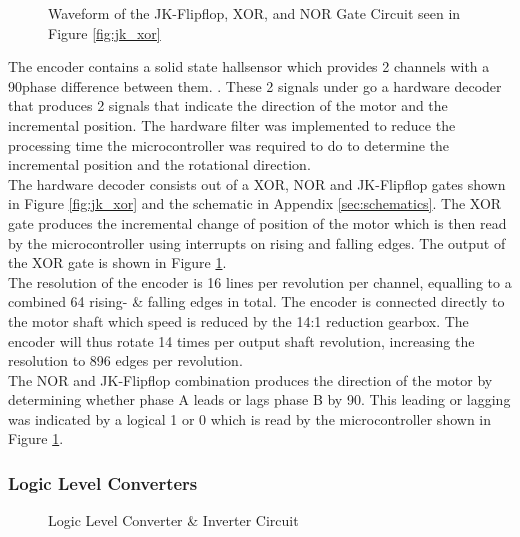 \begin{figure}[h]
	\centering
	
	\caption{Waveform of the JK-Flipflop, XOR, and NOR Gate Circuit seen in Figure \ref{fig:jk_xor}}
	\label{fig:jk_xor_waveform}
\end{figure}

The encoder contains a solid state hallsensor which provides 2 channels with a 90\textdegree \space phase difference between them. \citep{faulhaberencoder}. These 2 signals under go a hardware decoder that produces 2 signals that indicate the direction of the motor and the incremental position. The hardware filter was implemented to reduce the processing time the microcontroller was required to do to determine the incremental position and the rotational direction.\\

The hardware decoder consists out of a XOR, NOR and JK-Flipflop gates shown in Figure \ref{fig:jk_xor} and the schematic in Appendix \ref{sec:schematics}. The XOR gate produces the incremental change of position of the motor which is then read by the microcontroller using interrupts on rising and falling edges. The output of the XOR gate is shown in Figure \ref{fig:jk_xor_waveform}.\\

The resolution of the encoder is 16 lines per revolution per channel, equalling to a combined 64 rising- \& falling edges in total. The encoder is connected directly to the motor shaft which speed is reduced by the 14:1 reduction gearbox. The encoder will thus rotate 14 times per output shaft revolution, increasing the resolution to 896 edges per revolution.\\

 The NOR and JK-Flipflop combination produces the direction of the motor by determining whether phase A leads or lags phase B by 90\textdegree. This leading or lagging was indicated by a logical 1 or 0 which is read by the microcontroller shown in Figure \ref{fig:jk_xor_waveform}.\\
 
 \subsubsection{Logic Level Converters}
 \begin{figure}[h]
 	\centering
 	
 	\caption{Logic Level Converter \& Inverter Circuit}
 	\label{fig:interterCirc}
 \end{figure}
 
